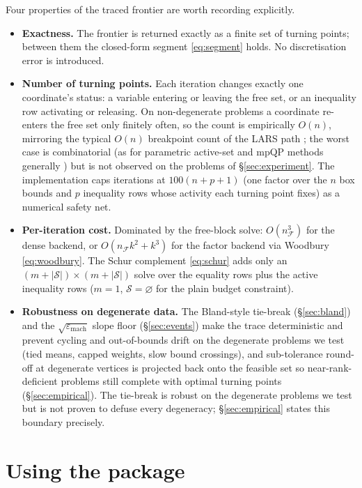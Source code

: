 \documentclass[11pt]{article}
\newcommand{\F}{\mathcal{F}}        %
\newcommand{\Sset}{\mathcal{S}}     %
\begin{document}
Four properties of the traced frontier are worth recording explicitly.

\begin{itemize}
\item \textbf{Exactness.} The frontier is returned exactly as a finite set of turning
points; between them the closed-form segment \eqref{eq:segment} holds. No
discretisation error is introduced.

\item \textbf{Number of turning points.} Each iteration changes exactly one
coordinate's status: a variable entering or leaving the free set, or an inequality
row activating or releasing. On non-degenerate problems a coordinate re-enters the
free set only finitely often, so the count is empirically $O(n)$, mirroring the
typical $O(n)$ breakpoint count of the LARS path \citep{efron2004}; the worst case is
combinatorial (as for parametric active-set and mpQP methods generally
\citep{bemporad2002}) but is not observed on
the problems of \S\ref{sec:experiment}. The implementation caps iterations at
$100(n+p+1)$ (one factor over the $n$ box bounds and $p$ inequality rows whose
activity each turning point fixes) as a numerical safety net.

\item \textbf{Per-iteration cost.} Dominated by the free-block solve: $O(n_\F^3)$ for
the dense backend, or $O(n_\F k^2 + k^3)$ for the factor backend via Woodbury
\eqref{eq:woodbury}. The Schur complement \eqref{eq:schur} adds only an
$(m+|\Sset|)\times(m+|\Sset|)$ solve over the equality rows plus the active
inequality rows ($m=1$, $\Sset=\varnothing$ for the plain budget constraint).

\item \textbf{Robustness on degenerate data.} The Bland-style tie-break
(\S\ref{sec:bland}) and the $\sqrt{\varepsilon_{\text{mach}}}$ slope floor
(\S\ref{sec:events}) make the trace deterministic and prevent cycling and
out-of-bounds drift on the degenerate problems we test (tied means, capped
weights, slow bound crossings), and sub-tolerance round-off at degenerate vertices
is projected back onto the feasible set so near-rank-deficient problems still
complete with optimal turning points (\S\ref{sec:empirical}). The tie-break is robust
on the degenerate problems we test but is not proven to defuse every degeneracy;
\S\ref{sec:empirical} states this boundary precisely.
\end{itemize}

\section{Using the package}
\label{sec:usage}
\end{document}
